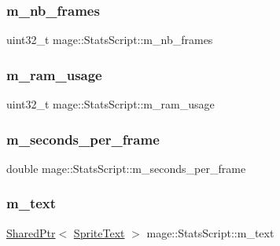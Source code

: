 \subsubsection{\texorpdfstring{m\+\_\+nb\+\_\+frames}{m\_nb\_frames}}
{\footnotesize\ttfamily uint32\+\_\+t mage\+::\+Stats\+Script\+::m\+\_\+nb\+\_\+frames\hspace{0.3cm}{\ttfamily [private]}}

\hypertarget{classmage_1_1_stats_script_a2874d123662ab2aabe28c1cf70d8f15d}{}\label{classmage_1_1_stats_script_a2874d123662ab2aabe28c1cf70d8f15d} 
\subsubsection{\texorpdfstring{m\+\_\+ram\+\_\+usage}{m\_ram\_usage}}
{\footnotesize\ttfamily uint32\+\_\+t mage\+::\+Stats\+Script\+::m\+\_\+ram\+\_\+usage\hspace{0.3cm}{\ttfamily [private]}}

\hypertarget{classmage_1_1_stats_script_a2ab46c9b9f153822f6a9cfa721cbe0da}{}\label{classmage_1_1_stats_script_a2ab46c9b9f153822f6a9cfa721cbe0da} 
\subsubsection{\texorpdfstring{m\+\_\+seconds\+\_\+per\+\_\+frame}{m\_seconds\_per\_frame}}
{\footnotesize\ttfamily double mage\+::\+Stats\+Script\+::m\+\_\+seconds\+\_\+per\+\_\+frame\hspace{0.3cm}{\ttfamily [private]}}

\hypertarget{classmage_1_1_stats_script_a35bb45baabf290be684c8b67f30feeb7}{}\label{classmage_1_1_stats_script_a35bb45baabf290be684c8b67f30feeb7} 
\subsubsection{\texorpdfstring{m\+\_\+text}{m\_text}}
{\footnotesize\ttfamily \hyperlink{namespacemage_a1e01ae66713838a7a67d30e44c67703e}{Shared\+Ptr}$<$ \hyperlink{classmage_1_1_sprite_text}{Sprite\+Text} $>$ mage\+::\+Stats\+Script\+::m\+\_\+text\hspace{0.3cm}{\ttfamily [private]}}

